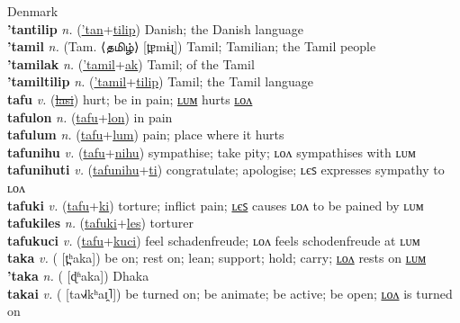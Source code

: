 Denmark \label{'tantec} \\
\textbf{'tantilip} \textit{n.} (\hyperref['tan]{'tan}+\hyperref[tilip]{tilip})
Danish; the Danish language \label{'tantilip} \\
\textbf{'tamil} \textit{n.} (Tam. ⟨தமிழ்⟩ [t̪ɐmɨɻ])
Tamil; Tamilian; the Tamil people \label{'tamil} \\
\textbf{'tamilak} \textit{n.} (\hyperref['tamil]{'tamil}+\hyperref[ak]{ak})
Tamil; of the Tamil \label{'tamilak} \\
\textbf{'tamiltilip} \textit{n.} (\hyperref['tamil]{'tamil}+\hyperref[tilip]{tilip})
Tamil; the Tamil language \label{'tamiltilip} \\
\textbf{tafu} \textit{v.} (\hyperref[lasi]{\sout{lasi}})
hurt; be in pain; \hyperref[tafulum]{ʟᴜᴍ} hurts \hyperref[tafulon]{ʟᴏᴧ} \label{tafu} \\
\textbf{tafulon} \textit{n.} (\hyperref[tafu]{tafu}+\hyperref[lon]{lon})
in pain \label{tafulon} \\
\textbf{tafulum} \textit{n.} (\hyperref[tafu]{tafu}+\hyperref[lum]{lum})
pain; place where it hurts \label{tafulum} \\
\textbf{tafunihu} \textit{v.} (\hyperref[tafu]{tafu}+\hyperref[nihu]{nihu})
sympathise; take pity; ʟᴏᴧ sympathises with ʟᴜᴍ \label{tafunihu} \\
\textbf{tafunihuti} \textit{v.} (\hyperref[tafunihu]{tafunihu}+\hyperref[ti]{ti})
congratulate; apologise; ʟєꜱ expresses sympathy to ʟᴏᴧ \label{tafunihuti} \\
\textbf{tafuki} \textit{v.} (\hyperref[tafu]{tafu}+\hyperref[ki]{ki})
torture; inflict pain; \hyperref[tafukiles]{ʟєꜱ} causes ʟᴏᴧ to be pained by ʟᴜᴍ \label{tafuki} \\
\textbf{tafukiles} \textit{n.} (\hyperref[tafuki]{tafuki}+\hyperref[les]{les})
torturer \label{tafukiles} \\
\textbf{tafukuci} \textit{v.} (\hyperref[tafu]{tafu}+\hyperref[kuci]{kuci})
feel schadenfreude; ʟᴏᴧ feels schodenfreude at ʟᴜᴍ \label{tafukuci} \\
\textbf{taka} \textit{v.} ( [t̪ʰaka])
be on; rest on; lean; support; hold; carry; \hyperref[takalon]{ʟᴏᴧ} rests on \hyperref[takalum]{ʟᴜᴍ} \label{taka} \\
\textbf{'taka} \textit{n.} ( [ɖʱaka])
Dhaka \label{'taka} \\
\textbf{takai} \textit{v.} ( [ta˧˩˧kʰaɪ̯˥])
be turned on; be animate; be active; be open; \hyperref[takailon]{ʟᴏᴧ} is turned on \label{takai} \\
